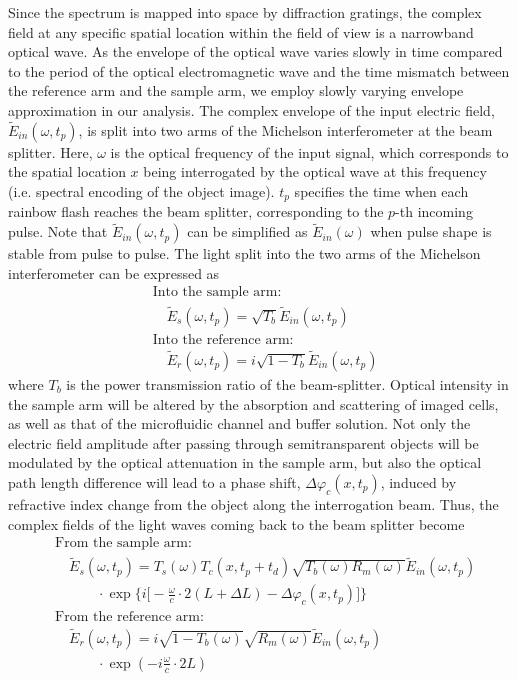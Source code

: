 \documentclass[aps,pra,reprint,superscriptaddress]{revtex4-1}
\begin{document}
Since the spectrum is mapped into space by diffraction gratings, the complex field at any specific spatial location within the field of view is a narrowband optical wave. As the envelope of the optical wave varies slowly in time compared to the period of the optical electromagnetic wave and the time mismatch between the reference arm and the sample arm, we employ slowly varying envelope approximation in our analysis. The complex envelope of the input electric field, $\tilde{E}_{in}(\omega, t_p)$, is split into two arms of the Michelson interferometer at the beam splitter. Here, $\omega$ is the optical frequency of the input signal, which corresponds to the spatial location $x$ being interrogated by the optical wave at this frequency (i.e. spectral encoding of the object image). $t_p$ specifies the time when each rainbow flash reaches the beam splitter, corresponding to the $p$-th incoming pulse. Note that $\tilde{E}_{in}(\omega,t_p)$ can be simplified as $\tilde{E}_{in}(\omega)$ when pulse shape is stable from pulse to pulse. The light split into the two arms of the Michelson interferometer can be expressed as
\begin{equation}
\begin{split}
&\text{Into the sample arm:} \\
&\quad \tilde{E}_s(\omega, t_p) = \sqrt{T_b} \tilde{E}_{in}(\omega, t_p)  \\
&\text{Into the reference arm:} \\
&\quad \tilde{E}_r(\omega, t_p) = i \sqrt{1-T_b} \tilde{E}_{in}(\omega, t_p)
\end{split}
\end{equation}
where $T_b$ is the power transmission ratio of the beam-splitter. Optical intensity in the sample arm will be altered by the absorption and scattering of imaged cells, as well as that of the microfluidic channel and buffer solution. Not only the electric field amplitude after passing through semitransparent objects will be modulated by the optical attenuation in the sample arm, but also the optical path length difference will lead to a phase shift, $\Delta\varphi_c(x,t_p)$, induced by refractive index change from the object along the interrogation beam. Thus, the complex fields of the light waves coming back to the beam splitter become
\begin{equation}
\begin{split}
&\text{From the sample arm:}\\
&\quad \tilde{E}_s(\omega, t_p) = T_s(\omega) T_c(x,t_p + t_d) \sqrt{T_b(\omega) R_m(\omega)} \tilde{E}_{in}(\omega, t_p) \\
&\quad\quad\quad \cdot \exp \Big\lbrace i\Big[-\frac{\omega}{c} \cdot 2(L+\Delta L) - \Delta\varphi_c(x,t_p)\Big] \Big\rbrace\\
&\text{From the reference arm:} \\
&\quad \tilde{E}_r(\omega, t_p) = i \sqrt{1-T_b(\omega)} \sqrt{R_m(\omega)} \tilde{E}_{in}(\omega, t_p) \\
&\quad\quad\quad \cdot \exp(- i \frac{\omega}{c}\cdot 2L)
\end{split}
\end{equation}
\end{document}
